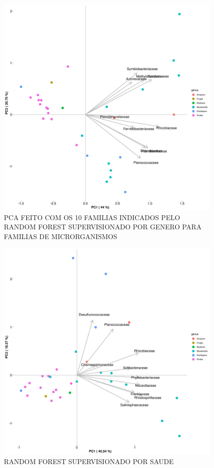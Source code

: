 \documentclass[12pt, a4paper]{report}
\begin{document}
\begin{figure}[H]
\centering
\includegraphics[scale=0.3]{figures/familia/pca_corais_mg_rast_rf_supervisionado_genus_10_familias_30_10_2018.jpg}
\caption{PCA FEITO COM OS 10 FAMILIAS INDICADOS PELO RANDOM FOREST SUPERVISIONADO POR GENERO PARA FAMILIAS DE MICRORGANISMOS}
\label{fig:PCA10FAMILIASDERIVADODORFSUPERVISIONADOGENEROPFAMILIAS}
\end{figure}

\begin{figure}[H]
\centering
\includegraphics[scale=0.3]{figures/familia/randomforest_supervisionado_saude_corais_mgrast_familia_leticia_2018_10_30.jpeg}
\caption{RANDOM FOREST SUPERVISIONADO POR SAUDE}
\label{fig:RANDOMFORESTSUPERVISIONADOPORSAUDE}
\end{figure}
\end{document}
